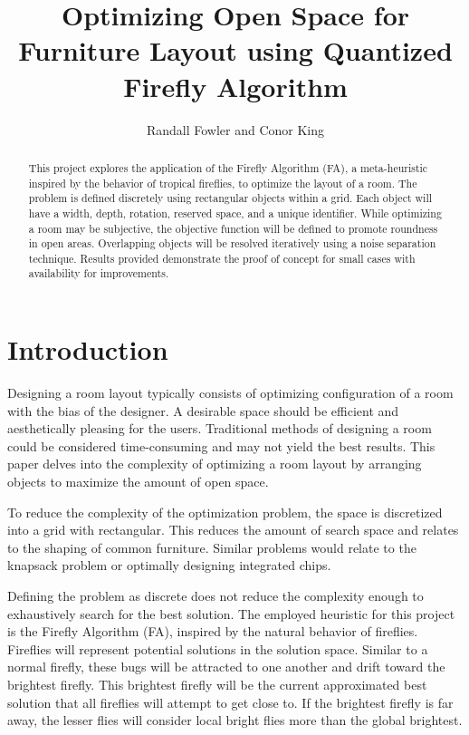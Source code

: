 \documentclass[sigconf,authordraft]{acmart}
\begin{document}
\graphicspath{{figures/}} %

\title{Optimizing Open Space for Furniture Layout using Quantized Firefly Algorithm}

\author{
    Randall Fowler and Conor King
}


\begin{abstract}
    This project explores the application of the Firefly Algorithm (FA), a meta-heuristic inspired by the behavior of tropical fireflies, to optimize the layout of a room. The problem is defined discretely using rectangular objects within a grid. Each object will have a width, depth, rotation, reserved space, and a unique identifier. While optimizing a room may be subjective, the objective function will be defined to promote roundness in open areas. Overlapping objects will be resolved iteratively using a noise separation technique. Results provided demonstrate the proof of concept for small cases with availability for improvements.
\end{abstract}


\maketitle

\section{Introduction}
Designing a room layout typically consists of optimizing configuration of a room with the bias of the designer. A desirable space should be efficient and aesthetically pleasing for the users. Traditional methods of designing a room could be considered time-consuming and may not yield the best results. This paper delves into the complexity of optimizing a room layout by arranging objects to maximize the amount of open space. 

To reduce the complexity of the optimization problem, the space is discretized into a grid with rectangular. This reduces the amount of search space and relates to the shaping of common furniture. Similar problems would relate to the knapsack problem or optimally designing integrated chips.

Defining the problem as discrete does not reduce the complexity enough to exhaustively search for the best solution. The employed heuristic for this project is the Firefly Algorithm (FA), inspired by the natural behavior of fireflies. Fireflies will represent potential solutions in the solution space. Similar to a normal firefly, these bugs will be attracted to one another and drift toward the brightest firefly. This brightest firefly will be the current approximated best solution that all fireflies will attempt to get close to. If the brightest firefly is far away, the lesser flies will consider local bright flies more than the global brightest.
\end{document}
